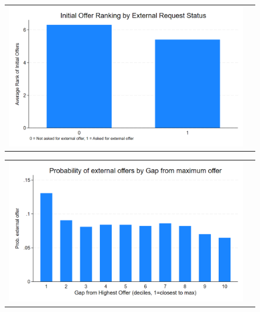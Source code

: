 \documentclass[12pt]{article}
\begin{document}
\begin{figure}[H]
\caption{}
\label{fig:ie11_2}
\centering{}%
\begin{tabular}{cc}
\includegraphics[scale=0.27]{../figures/IE11/IE11_bar_ranking_by_external.png} 
\end{tabular}
\end{figure}



\begin{figure}[H]
\caption{}
\label{fig:ie11_3}
\centering{}%
\begin{tabular}{cc}
\includegraphics[scale=0.27]{../figures/IE11/IE11_bar_external_by_gapfrommax.png} 
\end{tabular}
\end{figure}
\end{document}
